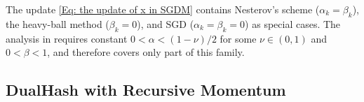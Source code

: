 \begin{remark}
{The update \eqref{Eq: the update of x in SGDM} contains Nesterov's scheme ($\alpha_k=\beta_k$), the heavy-ball method ($\beta_k=0$), and SGD ($\alpha_k=\beta_k=0$) as special cases. The analysis in  requires constant $0<\alpha<(1-\nu)/2$ for some $\nu\in(0,1)$ and $0<\beta<1$, and therefore covers only part of this family.} 
\end{remark}
\subsection{DualHash with Recursive Momentum}
\label{Sec: DualHash StoRM}

